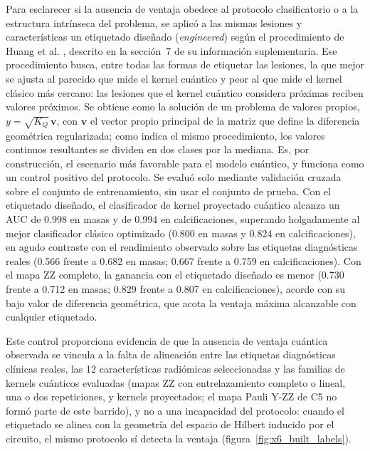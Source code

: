 Para esclarecer si la ausencia de ventaja obedece al protocolo clasificatorio o a la estructura intrínseca del problema, se aplicó a las mismas lesiones y características un etiquetado diseñado (\textit{engineered}) según el procedimiento de Huang et al. \cite{huang2021power}, descrito en la sección~7 de su información suplementaria. Ese procedimiento busca, entre todas las formas de etiquetar las lesiones, la que mejor se ajusta al parecido que mide el kernel cuántico y peor al que mide el kernel clásico más cercano: las lesiones que el kernel cuántico considera próximas reciben valores próximos. Se obtiene como la solución de un problema de valores propios, $y = \sqrt{K_Q}\,\mathbf{v}$, con $\mathbf{v}$ el vector propio principal de la matriz que define la diferencia geométrica regularizada; como indica el mismo procedimiento, los valores continuos resultantes se dividen en dos clases por la mediana. Es, por construcción, el escenario más favorable para el modelo cuántico, y funciona como un control positivo del protocolo. Se evaluó solo mediante validación cruzada sobre el conjunto de entrenamiento, sin usar el conjunto de prueba. Con el etiquetado diseñado, el clasificador de kernel proyectado cuántico alcanza un AUC de 0.998 en masas y de 0.994 en calcificaciones, superando holgadamente al mejor clasificador clásico optimizado (0.800 en masas y 0.824 en calcificaciones), en agudo contraste con el rendimiento observado sobre las etiquetas diagnósticas reales (0.566 frente a 0.682 en masas; 0.667 frente a 0.759 en calcificaciones). Con el mapa ZZ completo, la ganancia con el etiquetado diseñado es menor (0.730 frente a 0.712 en masas; 0.829 frente a 0.807 en calcificaciones), acorde con su bajo valor de diferencia geométrica, que acota la ventaja máxima alcanzable con cualquier etiquetado.

Este control proporciona evidencia de que la ausencia de ventaja cuántica observada se vincula a la falta de alineación entre las etiquetas diagnósticas clínicas reales, las 12 características radiómicas seleccionadas y las familias de kernels cuánticos evaluadas (mapas ZZ con entrelazamiento completo o lineal, una o dos repeticiones, y kernels proyectados; el mapa Pauli Y-ZZ de C5 no formó parte de este barrido), y no a una incapacidad del protocolo: cuando el etiquetado se alinea con la geometría del espacio de Hilbert inducido por el circuito, el mismo protocolo sí detecta la ventaja (figura~\ref{fig:x6_built_labels}).

